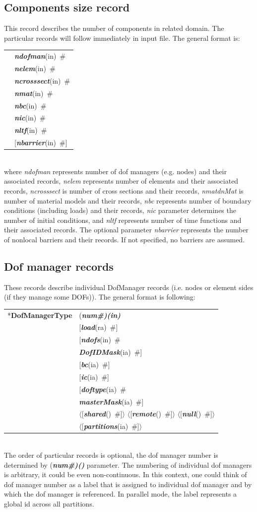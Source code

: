 \documentclass[a4paper]{article}
\makeatletter
\newcommand{\param}[1]{{\em #1}}
\newcommand{\fieldVal}[2]{\mbox{({\it\bf{#1}\#)\tiny (#2)}}}
\newcommand{\keywordnotype}[1]{\mbox{{\it{\bf{#1}}}}}
\newcommand{\keyword}[2]{\mbox{{\keywordnotype{#1}\tiny (#2)}}}
\newcommand{\entKeyword}[1]{\mbox{{*{\bf{#1}}}}}
\newcommand{\field}[2]{\mbox{\keyword{#1}{#2}~\#}}
\newcommand{\optField}[2]{\mbox{[\field{#1}{#2}]}}
\newcommand{\Pmode}[1]{{\sffamily #1}}
\newcommand{\PoptField}[2]{\mbox{$\langle$[\field{#1}{#2}]$\rangle$}}
\newenvironment{record}[1][]{\begin{tabular}{|ll}}{\end{tabular}\\}
\newcommand{\recentry}[2]{{#1}&{#2}\\}
\newcounter{rcc}
\newenvironment{record}[1][\textwidth]{\setcounter{rcc}{0}\begin{tabular*}{#1}{|ll@{\extracolsep{\fill}}r}}{\end{tabular*}\\}
\newcommand{\recentry}[2]{\ifthenelse{\value{rcc}>0}{&$\backslash$ \\}{\setcounter{rcc}{1}}{#1}&{#2}}
\makeatother
\begin{document}
\subsection{Components size record}
\label{_ComponentsSizeRecord}
This record describes the number of components in related domain. The
particular records will follow immediately in input file. The general format is:\\
\begin{record}
  \recentry{}{\field{ndofman}{in}}  \recentry{}{\field{nelem}{in}}
  \recentry{}{\field{ncrosssect}{in}}  \recentry{}{\field{nmat}{in}}  \recentry{}{\field{nbc}{in}}
  \recentry{}{\field{nic}{in}}  \recentry{}{\field{nltf}{in}} \recentry{}{\optField{nbarrier}{in}}
\end{record}
where \param{ndofman} represents number of dof managers (e.g. nodes) and their associated  records,
\param{nelem} represents number of elements and their associated records, \param{ncrosssect} is
number of cross sections and their records, \param{nmatdnMat}{} is number of material
models and their records, \param{nbc}{} represents number of boundary
conditions (including loads) and their
records, \param{nic} parameter determines the number of initial
conditions, and \param{nltf} represents number of time functions and
their associated records. The optional parameter \param{nbarrier}
represents the number of nonlocal barriers and their records. If not
specified, no barriers are assumed.

\subsection{Dof manager records}
\label{_NodeElementSideRecords}
These records describe individual DofManager records (i.e. nodes or element sides (if they manage some DOFs)). The general format is following:

\noindent
\begin{record}
  \recentry{\entKeyword{DofManagerType}}{\fieldVal{num}{in}}
           \recentry{}{[\field{load}{ra}]} \recentry{}{[\field{ndofs}{in}}
             \recentry{}{\field{DofIDMask}{ia}]}
           \recentry{}{\optField{bc}{ia}} \recentry{}{\optField{ic}{ia}}
           \recentry{}{[\field{doftype}{ia}} \recentry{}{\field{masterMask}{ia}]}
           \recentry{}{\PoptField{shared}{} \PoptField{remote}{} \PoptField{null}{}}
             \recentry{}{\PoptField{partitions}{ia}}
\end{record}
The order of particular records is optional, the dof manager number is determined by \fieldVal{num}{} parameter.
The numbering of individual dof managers is arbitrary, it could be even non-continuous. In this context, one could think of dof manager number as a label that is assigned to individual dof manager and by which the dof manager is referenced.
\Pmode{In parallel mode, the label represents a global id across all partitions.}
\end{document}
